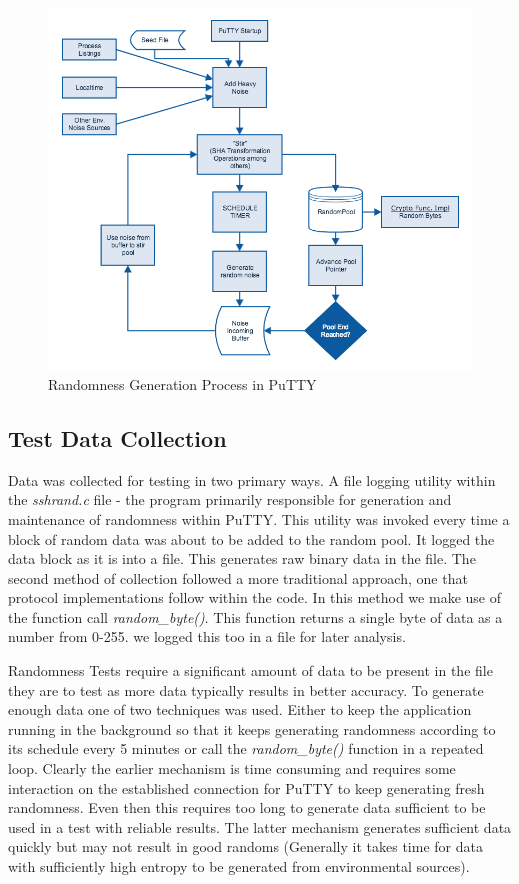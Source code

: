\documentclass{bhamthesis}
\begin{document}
\begin{figure}[ht]
\caption{Randomness Generation Process in PuTTY}
\centering
\includegraphics[width=1\textwidth]{NG.png}
\end{figure}
\subsection{Test Data Collection}
Data was collected for testing in two primary ways. A file logging utility within the \textit{sshrand.c} file - the program primarily responsible for generation and maintenance of randomness within PuTTY. This utility was invoked every time a block of random data was about to be added to the random pool. It logged the data block as it is into a file. This generates raw binary data in the file. The second method of collection followed a more traditional approach, one that protocol implementations follow within the code. In this method we make use of the function call \textit{random\_byte()}. This function returns a single byte of data as a number from 0-255. we logged this too in a file for later analysis.\par
Randomness Tests require a significant amount of data to be present in the file they are to test as more data typically results in better accuracy. To generate enough data one of two techniques was used. Either to keep the application running in the background so that it keeps generating randomness according to its schedule every 5 minutes or call the \textit{random\_byte()} function in a repeated loop. Clearly the earlier mechanism is time consuming and requires some interaction on the established connection for PuTTY to keep generating fresh randomness. Even then this requires too long to generate data sufficient to be used in a test with reliable results. The latter mechanism generates sufficient data quickly but may not result in good randoms (Generally it takes time for data with sufficiently high entropy to be generated from environmental sources).
\end{document}
